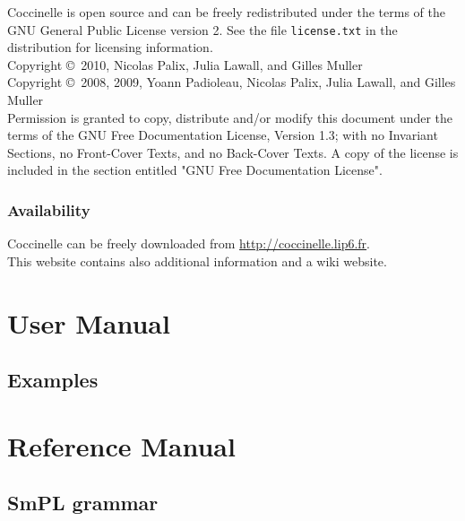 \documentclass{report}
\begin{document}
Coccinelle is open source and can be freely redistributed under the
terms of the GNU General Public License version 2. See the file
\verb+license.txt+ in the distribution for licensing information.\\

\noindent
Copyright \copyright~2010,  Nicolas Palix, Julia Lawall, and Gilles Muller\\
Copyright \copyright~2008, 2009, Yoann Padioleau, Nicolas Palix, Julia Lawall, and Gilles Muller\\
    Permission is granted to copy, distribute and/or modify this document
    under the terms of the GNU Free Documentation License, Version 1.3;
    with no Invariant Sections, no Front-Cover Texts, and no Back-Cover Texts.
    A copy of the license is included in the section entitled "GNU
    Free Documentation License".

\section*{Availability}

Coccinelle can be freely downloaded
from \url{http://coccinelle.lip6.fr}.\\
This website contains also additional information and a wiki website.


\part{User Manual}
\label{part:usermanual}







\chapter{Examples}
















\part{Reference Manual}
\label{part:refmanual}

\chapter{SmPL grammar}
\end{document}
